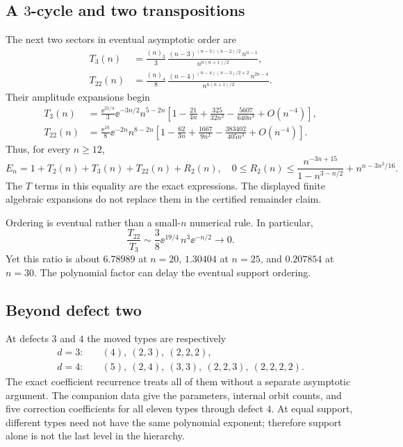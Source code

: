 \documentclass[11pt,letterpaper]{article}
\numberwithin{equation}{section}
\theoremstyle{definition}\newtheorem{definition}[theorem]{Definition}
\theoremstyle{remark}\newtheorem{remark}[theorem]{Remark}
\begin{document}
\subsection{A $3$-cycle and two transpositions}
The next two sectors in eventual asymptotic order are
\begin{align}
 T_3(n)&=\frac{(n)_3}{3}\,
 \frac{(n-3)^{(n-3)(n-2)/2}\,n^{n-1}}{n^{n(n+1)/2}},\label{cmg:eq:T3exact}\\
 T_{22}(n)&=\frac{(n)_4}{8}\,
 \frac{(n-4)^{(n-4)(n-3)/2+2}\,n^{2n-4}}{n^{n(n+1)/2}}.\label{cmg:eq:T22exact}
\end{align}
Their amplitude expansions begin
\begin{align}
 T_3(n)&=\frac{\ee^{21/4}}3\ee^{-3n/2}n^{5-2n}
 \left[1-\frac{21}{4n}+\frac{325}{32n^2}-\frac{5607}{640n^3}+O(n^{-4})\right],\label{cmg:eq:T3exp}\\
 T_{22}(n)&=\frac{\ee^{10}}8\ee^{-2n}n^{8-2n}
 \left[1-\frac{62}{3n}+\frac{1667}{9n^2}-\frac{383402}{405n^3}+O(n^{-4})\right].\label{cmg:eq:T22exp}
\end{align}
Thus, for every $n\ge12$,
\begin{equation}\label{cmg:eq:three-sector}
 E_n=1+T_2(n)+T_3(n)+T_{22}(n)+R_2(n),\quad
 0\le R_2(n)\le\frac{n^{-3n+15}}{1-n^{3-n/2}}+n^{n-3n^2/16}.
\end{equation}
The $T$ terms in this equality are the exact expressions. The displayed finite algebraic expansions do not replace them in the certified remainder claim.

Ordering is eventual rather than a small-$n$ numerical rule. In particular,
\[
 \frac{T_{22}}{T_3}\sim\frac38\ee^{19/4}\,n^3\ee^{-n/2}\longrightarrow0.
\]
Yet this ratio is about $6.78989$ at $n=20$, $1.30404$ at $n=25$, and $0.207854$ at $n=30$. The polynomial factor can delay the eventual support ordering.

\subsection{Beyond defect two}
At defects $3$ and $4$ the moved types are respectively
\begin{align*}
 d=3:&\quad (4),\ (2,3),\ (2,2,2),\\
 d=4:&\quad (5),\ (2,4),\ (3,3),\ (2,2,3),\ (2,2,2,2).
\end{align*}
The exact coefficient recurrence treats all of them without a separate asymptotic argument. The companion data give the parameters, internal orbit counts, and five correction coefficients for all eleven types through defect $4$. At equal support, different types need not have the same polynomial exponent; therefore support alone is not the last level in the hierarchy.
\end{document}
